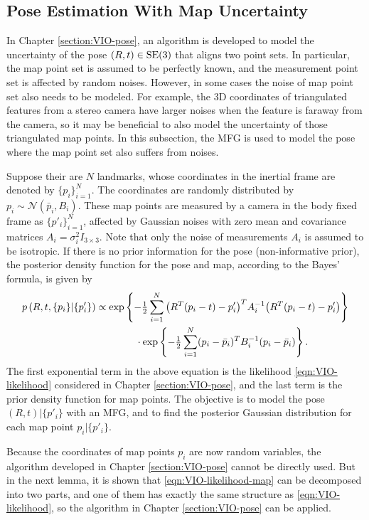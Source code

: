 \subsection{Pose Estimation With Map Uncertainty} \label{section:VIO-pose-map}

In Chapter \ref{section:VIO-pose}, an algorithm is developed to model the uncertainty of the pose $(R,t)\in\mathrm{SE}(3)$ that aligns two point sets.
In particular, the map point set is assumed to be perfectly known, and the measurement point set is affected by random noises.
However, in some cases the noise of map point set also needs to be modeled.
For example, the 3D coordinates of triangulated features from a stereo camera have larger noises when the feature is faraway from the camera, so it may be beneficial to also model the uncertainty of those triangulated map points.
In this subsection, the MFG is used to model the pose where the map point set also suffers from noises.

Suppose their are $N$ landmarks, whose coordinates in the inertial frame are denoted by $\{p_i\}_{i=1}^N$.
The coordinates are randomly distributed by $p_i \sim \mathcal{N}(\bar{p}_i, B_i)$.
These map points are measured by a camera in the body fixed frame as $\{p'_i\}_{i=1}^N$, affected by Gaussian noises with zero mean and covariance matrices $A_i = \sigma_i^2I_{3\times 3}$.
Note that only the noise of measurements $A_i$ is assumed to be isotropic.
If there is no prior information for the pose (non-informative prior), the posterior density function for the pose and map, according to the Bayes' formula, is given by
\begin{align} \label{eqn:VIO-likelihood-map}
	p\left( R,t,\{p_i\} | \{p'_i\} \right) &\propto \exp\left\{ -\tfrac{1}{2} \sum_{i=1}^{N} \big(R^T(p_i-t)-p'_i\big)^T A_i^{-1} \big(R^T(p_i-t)-p'_i\big) \right\} \nonumber \\
	&\qquad\qquad \cdot \exp\left\{ -\tfrac{1}{2}\sum_{i=1}^N (p_i-\bar{p}_i)^T B_i^{-1} (p_i-\bar{p}_i) \right\}.
\end{align}
The first exponential term in the above equation is the likelihood \eqref{eqn:VIO-likelihood} considered in Chapter \ref{section:VIO-pose}, and the last term is the prior density function for map points.
The objective is to model the pose $(R,t)|\{p'_i\}$ with an MFG, and to find the posterior Gaussian distribution for each map point $p_i|\{p'_i\}$.

Because the coordinates of map points $p_i$ are now random variables, the algorithm developed in Chapter \ref{section:VIO-pose} cannot be directly used.
But in the next lemma, it is shown that \eqref{eqn:VIO-likelihood-map} can be decomposed into two parts, and one of them has exactly the same structure as \eqref{eqn:VIO-likelihood}, so the algorithm in Chapter \ref{section:VIO-pose} can be applied.

